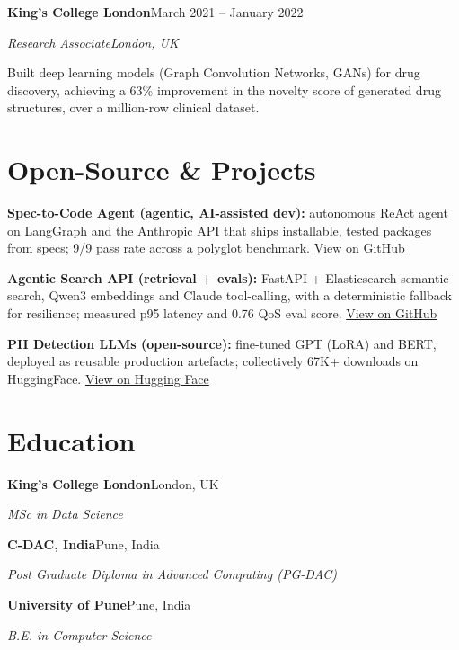 \documentclass[10pt,a4paper]{article}
\newcommand{\entry}[4]{%
  {\color{company}\bfseries #1}\hfill {\color{muted}#2}\par
  \vspace{1pt}
  {\itshape #3}\hfill {\color{muted}\itshape #4}\par
  \vspace{3pt}%
}
\begin{document}
\entry{King's College London}{March 2021 -- January 2022}{Research Associate}{London, UK}
\begin{tight}
  \item Built deep learning models (Graph Convolution Networks, GANs) for drug discovery, achieving a 63\% improvement in the novelty score of generated drug structures, over a million-row clinical dataset.
\end{tight}

\section{Open-Source \& Projects}
\begin{tight}
  \item \textbf{Spec-to-Code Agent (agentic, AI-assisted dev):} autonomous ReAct agent on LangGraph and the Anthropic API that ships installable, tested packages from specs; 9/9 pass rate across a polyglot benchmark. \href{https://github.com/abhijeetscode/Spec-to-Code-Agent}{View on GitHub}
  \item \textbf{Agentic Search API (retrieval + evals):} FastAPI + Elasticsearch semantic search, Qwen3 embeddings and Claude tool-calling, with a deterministic fallback for resilience; measured p95 latency and 0.76 QoS eval score. \href{https://github.com/abhijeetscode/search-agent}{View on GitHub}
  \item \textbf{PII Detection LLMs (open-source):} fine-tuned GPT (LoRA) and BERT, deployed as reusable production artefacts; collectively 67K+ downloads on HuggingFace. \href{https://huggingface.co/ab-ai/pii_model}{View on Hugging Face}
\end{tight}

\section{Education}
{\color{company}\bfseries King's College London}\hfill {\color{muted}London, UK}\par
{\itshape MSc in Data Science}\par\vspace{2pt}
{\color{company}\bfseries C-DAC, India}\hfill {\color{muted}Pune, India}\par
{\itshape Post Graduate Diploma in Advanced Computing (PG-DAC)}\par\vspace{2pt}
{\color{company}\bfseries University of Pune}\hfill {\color{muted}Pune, India}\par
{\itshape B.E. in Computer Science}\par
\end{document}
